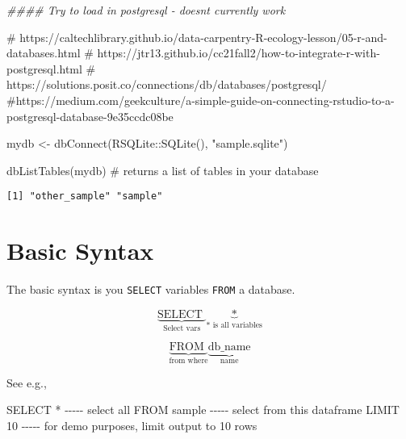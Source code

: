 \documentclass[
  letterpaper,
  DIV=11,
  numbers=noendperiod]{scrreprt}
\newenvironment{Shaded}{\begin{snugshade}}{\end{snugshade}}
\newcommand{\CommentTok}[1]{\textcolor[rgb]{0.37,0.37,0.37}{#1}}
\newcommand{\DecValTok}[1]{\textcolor[rgb]{0.68,0.00,0.00}{#1}}
\newcommand{\DocumentationTok}[1]{\textcolor[rgb]{0.37,0.37,0.37}{\textit{#1}}}
\newcommand{\FunctionTok}[1]{\textcolor[rgb]{0.28,0.35,0.67}{#1}}
\newcommand{\KeywordTok}[1]{\textcolor[rgb]{0.00,0.23,0.31}{#1}}
\newcommand{\NormalTok}[1]{\textcolor[rgb]{0.00,0.23,0.31}{#1}}
\newcommand{\OperatorTok}[1]{\textcolor[rgb]{0.37,0.37,0.37}{#1}}
\newcommand{\OtherTok}[1]{\textcolor[rgb]{0.00,0.23,0.31}{#1}}
\newcommand{\SpecialCharTok}[1]{\textcolor[rgb]{0.37,0.37,0.37}{#1}}
\newcommand{\StringTok}[1]{\textcolor[rgb]{0.13,0.47,0.30}{#1}}
\begin{document}
\begin{Shaded}
\begin{Highlighting}[]
\DocumentationTok{\#\#\#\# Try to load in postgresql {-} doesn\textquotesingle{}t currently work}

\CommentTok{\# https://caltechlibrary.github.io/data{-}carpentry{-}R{-}ecology{-}lesson/05{-}r{-}and{-}databases.html}
\CommentTok{\# https://jtr13.github.io/cc21fall2/how{-}to{-}integrate{-}r{-}with{-}postgresql.html}
\CommentTok{\# https://solutions.posit.co/connections/db/databases/postgresql/}
\CommentTok{\#https://medium.com/geekculture/a{-}simple{-}guide{-}on{-}connecting{-}rstudio{-}to{-}a{-}postgresql{-}database{-}9e35ccdc08be}
\end{Highlighting}
\end{Shaded}

\begin{Shaded}
\begin{Highlighting}[]
\NormalTok{mydb }\OtherTok{\textless{}{-}} \FunctionTok{dbConnect}\NormalTok{(RSQLite}\SpecialCharTok{::}\FunctionTok{SQLite}\NormalTok{(), }\StringTok{"sample.sqlite"}\NormalTok{)}

\FunctionTok{dbListTables}\NormalTok{(mydb) }\CommentTok{\# returns a list of tables in your database}
\end{Highlighting}
\end{Shaded}

\begin{verbatim}
[1] "other_sample" "sample"      
\end{verbatim}

\hypertarget{basic-syntax}{%
\section{Basic Syntax}\label{basic-syntax}}

The basic syntax is you \texttt{SELECT} variables \texttt{FROM} a
database.

\[\underbrace{\text{SELECT }}_{\text{Select vars}} \underbrace{\text{*}}_{\text{* is all variables}}\]

\[\underbrace{\text{FROM }}_{\text{from where}} \underbrace{\text{db\_name}}_{\text{name}}\]

See e.g.,

\begin{Shaded}
\begin{Highlighting}[]
\KeywordTok{SELECT} \OperatorTok{*} \CommentTok{{-}{-}{-}{-}{-} select all }
\KeywordTok{FROM} \KeywordTok{sample} \CommentTok{{-}{-}{-}{-}{-} select from this dataframe}
\KeywordTok{LIMIT} \DecValTok{10} \CommentTok{{-}{-}{-}{-}{-} for demo purposes, limit output to 10 rows}
\end{Highlighting}
\end{Shaded}
\end{document}
